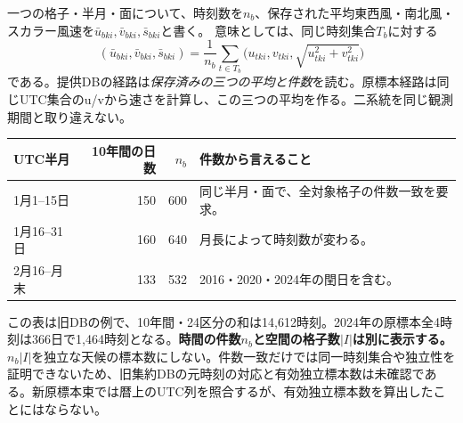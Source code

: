 \documentclass[11pt,a4paper]{article}
\begin{document}
\begin{center}
\end{center}

一つの格子・半月・面について、時刻数を$n_b$、保存された平均東西風・南北風・スカラー風速を$\bar u_{bki},\bar v_{bki},\bar s_{bki}$と書く。
意味としては、同じ時刻集合$T_b$に対する
\begin{equation}
 (\bar u_{bki},\bar v_{bki},\bar s_{bki})
 =\frac{1}{n_b}\sum_{t\in T_b}
 \bigl(u_{tki},v_{tki},\sqrt{u_{tki}^2+v_{tki}^2}\bigr)
 \label{eq:climate-time}
\end{equation}
である。提供DBの経路は\emph{保存済みの三つの平均と件数}を読む。原標本経路は同じUTC集合のu/vから速さを計算し、この三つの平均を作る。二系統を同じ観測期間と取り違えない。

\begin{center}\small
\begin{tabular}{@{}lrrp{65mm}@{}}
\toprule UTC半月 & 10年間の日数 & $n_b$ & 件数から言えること \\\midrule
1月1--15日 & 150 & 600 & 同じ半月・面で、全対象格子の件数一致を要求。\\
1月16--31日 & 160 & 640 & 月長によって時刻数が変わる。\\
2月16--月末 & 133 & 532 & 2016・2020・2024年の閏日を含む。\\\bottomrule
\end{tabular}
\end{center}
この表は旧DBの例で、10年間・24区分の和は14,612時刻。2024年の原標本全4時刻は366日で1,464時刻となる。\textbf{時間の件数$n_b$と空間の格子数$|I|$は別に表示する。}
$n_b|I|$を独立な天候の標本数にしない。件数一致だけでは同一時刻集合や独立性を証明できないため、旧集約DBの元時刻の対応と有効独立標本数は未確認である。新原標本束では暦上のUTC列を照合するが、有効独立標本数を算出したことにはならない。
\end{document}
